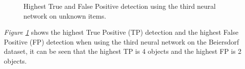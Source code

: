 \begin{figure}[h]
 \centering
 \hfill
 
 \caption{Highest True and False Positive detection using the third neural network on unknown items.}
 \label{fig:v3max}
\end{figure}

\textit{Figure \ref{fig:v3max}} shows the highest True Positive (TP) detection and the highest False Positive (FP) detection when using the third neural network on the Beiersdorf dataset, it can be seen that the highest TP is 4 objects and the highest FP is 2 objects.

\clearpage
